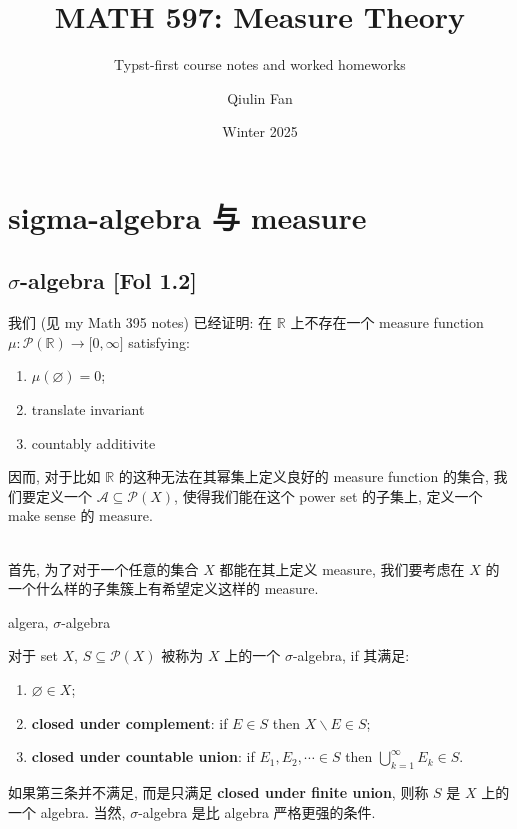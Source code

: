 \documentclass{qlnotes-export}
\title{MATH 597: Measure Theory}
\subtitle{Typst-first course notes and worked homeworks}
\author{Qiulin Fan}
\date{Winter 2025}
\begin{document}
\frontmatter
\maketitle
\tableofcontents

\mainmatter
\chapter{sigma-algebra 与 measure}\label{sigma-algebra-ux4e0e-measure}

\section{\texorpdfstring{\(\sigma\)-algebra {[}Fol 1.2{]}}{\textbackslash sigma-algebra {[}Fol 1.2{]}}}

我们 (见 my Math 395 notes) 已经证明: 在 \(\mathbb{R}\) 上不存在一个 measure function \(\mu:\mathcal{P}({\mathbb{R}})\rightarrow\lbrack 0,\infty\rbrack\) satisfying:

\begin{enumerate}
\item
  \(\mu(\varnothing) = 0\);
\item
  translate invariant
\item
  countably additivite
\end{enumerate}

因而, 对于比如 \(\mathbb{R}\) 的这种无法在其幂集上定义良好的 measure function 的集合, 我们要定义一个 \(\mathcal{A} \subseteq \mathcal{P}(X)\), 使得我们能在这个 power set 的子集上, 定义一个 make sense 的 measure.\\
\strut \\
首先, 为了对于一个任意的集合 \(X\) 都能在其上定义 measure, 我们要考虑在 \(X\) 的一个什么样的子集簇上有希望定义这样的 measure.

\begin{definition}{algera, \(\sigma\)-algebra}\label{def-01-sigma-algebra-measure-algera-sigma-algebra}

对于 set \(X\), \(S \subseteq \mathcal{P}(X)\) 被称为 \(X\) 上的一个 \(\sigma\)-algebra, if 其满足:

\begin{enumerate}
\item
  \(\varnothing \in X\);
\item
  \textbf{closed under complement}: if \(E \in S\) then \(X\backslash E \in S\);
\item
  \textbf{closed under countable union}: if \(E_{1},E_{2},\cdots \in S\) then \(\bigcup_{k = 1}^{\infty}E_{k} \in S\).
\end{enumerate}

如果第三条并不满足, 而是只满足 \textbf{closed under finite union}, 则称 \(S\) 是 \(X\) 上的一个 algebra. 当然, \(\sigma\)-algebra 是比 algebra 严格更强的条件.

\end{definition}
\end{document}
